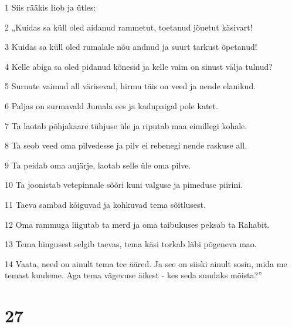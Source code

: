 \par 1 Siis rääkis Iiob ja ütles:
\par 2 „Kuidas sa küll oled aidanud rammetut, toetanud jõuetut käsivart!
\par 3 Kuidas sa küll oled rumalale nõu andnud ja suurt tarkust õpetanud!
\par 4 Kelle abiga sa oled pidanud kõnesid ja kelle vaim on sinust välja tulnud?
\par 5 Surnute vaimud all värisevad, hirmu täis on veed ja nende elanikud.
\par 6 Paljas on surmavald Jumala ees ja kadupaigal pole katet.
\par 7 Ta laotab põhjakaare tühjuse üle ja riputab maa eimillegi kohale.
\par 8 Ta seob veed oma pilvedesse ja pilv ei rebenegi nende raskuse all.
\par 9 Ta peidab oma aujärje, laotab selle üle oma pilve.
\par 10 Ta joonistab vetepinnale sõõri kuni valguse ja pimeduse piirini.
\par 11 Taeva sambad kõiguvad ja kohkuvad tema sõitlusest.
\par 12 Oma rammuga liigutab ta merd ja oma taibukuses peksab ta Rahabit.
\par 13 Tema hingusest selgib taevas, tema käsi torkab läbi põgeneva mao.
\par 14 Vaata, need on ainult tema tee ääred. Ja see on siiski ainult sosin, mida me temast kuuleme. Aga tema vägevuse äikest - kes seda suudaks mõista?”

\chapter{27}

